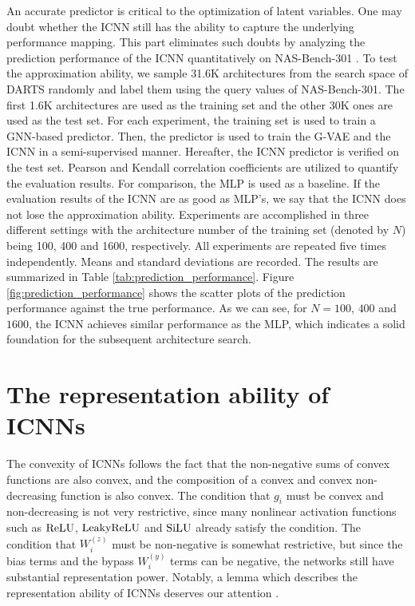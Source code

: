 \documentclass[10pt,twocolumn,letterpaper]{article}
\begin{document}
An accurate predictor is critical to the optimization of latent variables. One may doubt whether the ICNN still has the ability to capture the underlying performance mapping. This part eliminates such doubts by analyzing the prediction performance of the ICNN quantitatively on NAS-Bench-301 \cite{siems2020bench}. To test the approximation ability, we sample 31.6K architectures from the search space of DARTS randomly and label them using the query values of NAS-Bench-301. The first 1.6K architectures are used as the training set and the other 30K ones are used as the test set. For each experiment, the training set is used to train a GNN-based predictor. Then, the predictor is used to train the G-VAE and the ICNN in a semi-supervised manner. Hereafter, the ICNN predictor is verified on the test set. Pearson and Kendall correlation coefficients are utilized to quantify the evaluation results. For comparison, the MLP is used as a baseline. If the evaluation results of the ICNN are as good as MLP's, we say that the ICNN does not lose the approximation ability. Experiments are accomplished in three different settings with the architecture number of the training set (denoted by $N$) being 100, 400 and 1600, respectively. All experiments are repeated five times independently. Means and standard deviations are recorded. The results are summarized in Table \ref{tab:prediction_performance}. Figure \ref{fig:prediction_performance} shows the scatter plots of the prediction performance against the true performance. As we can see, for $N=100$, $400$ and $1600$, the ICNN achieves similar performance as the MLP, which indicates a solid foundation for the subsequent architecture search.

\section{The representation ability of ICNNs} 
The convexity of ICNNs follows the fact that the non-negative sums of convex functions are also convex, and the composition of a convex and convex non-decreasing function is also convex. The condition that $g_{i}$ must be convex and non-decreasing is not very restrictive, since many nonlinear activation functions such as $\rm ReLU$, $\rm LeakyReLU$ and $\rm SiLU$ already satisfy the condition. The condition that $W_{i}^{(z)}$ must be non-negative is somewhat restrictive, but since the bias terms and the bypass $W_{i}^{(y)}$ terms can be negative, the networks still have substantial representation power. Notably, a lemma which describes the representation ability of ICNNs deserves our attention \cite{chen2018optimal}. 
\end{document}
